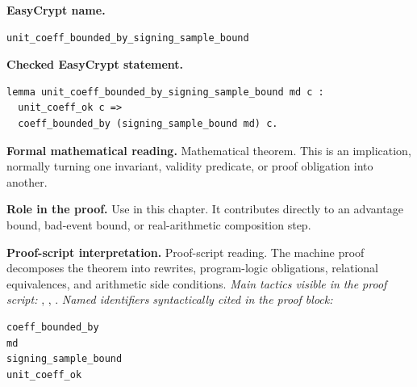 \begin{formaltheorem}
\noindent\textbf{EasyCrypt name.}
\begin{lstlisting}[language=EasyCrypt,basicstyle=\ttfamily\scriptsize]
unit_coeff_bounded_by_signing_sample_bound
\end{lstlisting}
\noindent\textbf{Checked EasyCrypt statement.}
\begin{lstlisting}[language=EasyCrypt,basicstyle=\ttfamily\scriptsize]
lemma unit_coeff_bounded_by_signing_sample_bound md c :
  unit_coeff_ok c =>
  coeff_bounded_by (signing_sample_bound md) c.
\end{lstlisting}
\noindent\textbf{Formal mathematical reading.}
Mathematical theorem. This is an implication, normally turning one invariant, validity predicate, or proof obligation into another.

\noindent\textbf{Role in the proof.}
Use in this chapter. It contributes directly to an advantage bound, bad-event bound, or real-arithmetic composition step.

\noindent\textbf{Proof-script interpretation.}
Proof-script reading. The machine proof decomposes the theorem into rewrites, program-logic obligations, relational equivalences, and arithmetic side conditions.
\emph{Main tactics visible in the proof script:} , , .
\emph{Named identifiers syntactically cited in the proof block:}
\begin{lstlisting}[language=EasyCrypt,basicstyle=\ttfamily\scriptsize]
coeff_bounded_by
md
signing_sample_bound
unit_coeff_ok
\end{lstlisting}

\end{formaltheorem}

